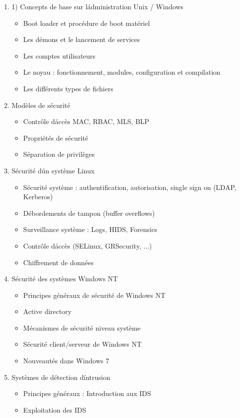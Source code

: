 {
\begin{enumerate}
\item 1) Concepts de base sur l\'administration Unix / Windows
  \begin{itemize}
  \item Boot loader et procédure de boot matériel
  \item Les démons et le lancement de services
  \item Les comptes utilisateurs
  \item Le noyau : fonctionnement, modules, configuration et compilation
  \item Les différents types de fichiers
  \end{itemize} 
\item Modèles de sécurité
  \begin{itemize}
  \item Contrôle d\'accès MAC, RBAC, MLS, BLP
  \item Propriétés de sécurité
  \item Séparation de privilèges
  \end{itemize} 
\item Sécurité d\'un système Linux
  \begin{itemize}
  \item Sécurité système : authentification, autorisation, single sign on (LDAP, Kerberos)
  \item Débordements de tampon (buffer overflows)
  \item Surveillance système : Logs, HIDS, Forensics 
  \item Contrôle d\'accès (SELinux, GRSecurity, ...)
  \item Chiffrement de données
  \end{itemize} 
\item Sécurité des systèmes Windows NT
  \begin{itemize}
  \item Principes généraux de sécurité de Windows NT
  \item Active directory
  \item Mécanismes de sécurité niveau système
  \item Sécurité client/serveur de Windows NT
  \item Nouveautés dans Windows 7
  \end{itemize} 
\item Systèmes de détection d\'intrusion
  \begin{itemize}
  \item Principes généraux : Introduction aux IDS
  \item Exploitation des IDS 
  \end{itemize} 
\end{enumerate}
} 
